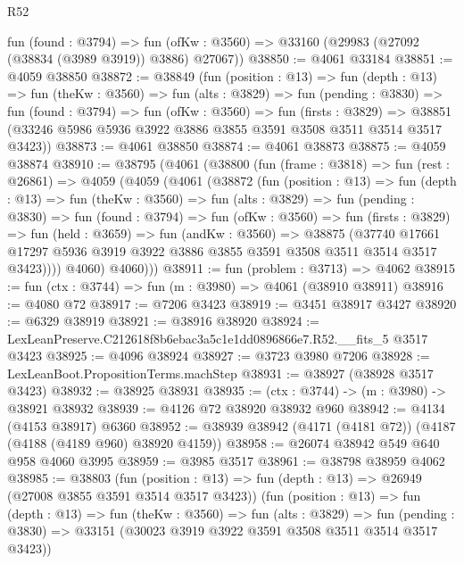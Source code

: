 \begin{lexlean}{R52}
\begin{coremodule}
    fun (found : @3794) =>
    fun (ofKw : @3560) => @33160 (@29983 (@27092 (@38834 (@3989 @3919)) @3886) @27067))
@38850 := @4061 @33184
@38851 := @4059 @38850
@38872 := @38849
    (fun (position : @13) =>
    fun (depth : @13) =>
    fun (theKw : @3560) =>
    fun (alts : @3829) =>
    fun (pending : @3830) =>
    fun (found : @3794) =>
    fun (ofKw : @3560) =>
    fun (firsts : @3829) =>
    @38851 (@33246 @5986 @5936 @3922 @3886 @3855 @3591 @3508 @3511 @3514 @3517 @3423))
@38873 := @4061 @38850
@38874 := @4061 @38873
@38875 := @4059 @38874
@38910 := @38795
    (@4061
      (@38800
        (fun (frame : @3818) =>
        fun (rest : @26861) =>
        @4059
          (@4059
            (@4061
              (@38872
                (fun (position : @13) =>
                fun (depth : @13) =>
                fun (theKw : @3560) =>
                fun (alts : @3829) =>
                fun (pending : @3830) =>
                fun (found : @3794) =>
                fun (ofKw : @3560) =>
                fun (firsts : @3829) =>
                fun (held : @3659) =>
                fun (andKw : @3560) =>
                @38875
                  (@37740
                    @17661
                    @17297
                    @5936
                    @3919
                    @3922
                    @3886
                    @3855
                    @3591
                    @3508
                    @3511
                    @3514
                    @3517
                    @3423))))
            @4060)
          @4060)))
@38911 := fun (problem : @3713) => @4062
@38915 := fun (ctx : @3744) => fun (m : @3980) => @4061 (@38910 @38911)
@38916 := @4080 @72
@38917 := @7206 @3423
@38919 := @3451 @38917 @3427
@38920 := @6329 @38919
@38921 := @38916 @38920
@38924 := LexLeanPreserve.C212618f8b6ebac3a5c1e1dd0896866e7.R52.__fits_5 @3517 @3423
@38925 := @4096 @38924
@38927 := @3723 @3980 @7206
@38928 := LexLeanBoot.PropositionTerms.machStep
@38931 := @38927 (@38928 @3517 @3423)
@38932 := @38925 @38931
@38935 := (ctx : @3744) -> (m : @3980) -> @38921 @38932
@38939 := @4126 @72 @38920 @38932 @960
@38942 := @4134 (@4153 @38917) @6360
@38952 := @38939 @38942 (@4171 (@4181 @72)) (@4187 (@4188 (@4189 @960) @38920 @4159))
@38958 := @26074 @38942 @549 @640 @958 @4060 @3995
@38959 := @3985 @3517
@38961 := @38798 @38959 @4062
@38985 := @38803
    (fun (position : @13) => fun (depth : @13) => @26949 (@27008 @3855 @3591 @3514 @3517 @3423))
    (fun (position : @13) =>
    fun (depth : @13) =>
    fun (theKw : @3560) =>
    fun (alts : @3829) =>
    fun (pending : @3830) => @33151 (@30023 @3919 @3922 @3591 @3508 @3511 @3514 @3517 @3423))

\end{coremodule}
\end{lexlean}
